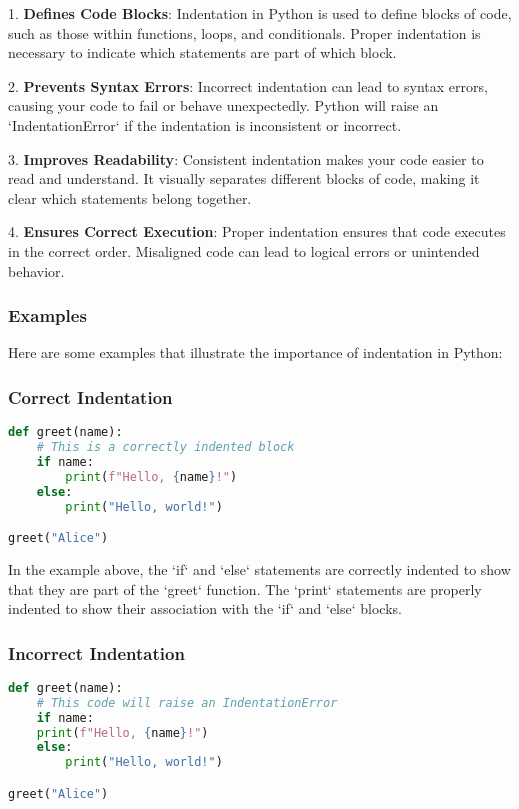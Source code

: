 1. \textbf{Defines Code Blocks}: Indentation in Python is used to define blocks of code, such as those within functions, loops, and conditionals. Proper indentation is necessary to indicate which statements are part of which block.

2. \textbf{Prevents Syntax Errors}: Incorrect indentation can lead to syntax errors, causing your code to fail or behave unexpectedly. Python will raise an `IndentationError` if the indentation is inconsistent or incorrect.

3. \textbf{Improves Readability}: Consistent indentation makes your code easier to read and understand. It visually separates different blocks of code, making it clear which statements belong together.

4. \textbf{Ensures Correct Execution}: Proper indentation ensures that code executes in the correct order. Misaligned code can lead to logical errors or unintended behavior.

\subsubsection{Examples}

Here are some examples that illustrate the importance of indentation in Python:

\subsubsection{Correct Indentation}

\begin{lstlisting}[language=Python, caption=Correct Indentation Example]
def greet(name):
    # This is a correctly indented block
    if name:
        print(f"Hello, {name}!")
    else:
        print("Hello, world!")

greet("Alice")
\end{lstlisting}

In the example above, the `if` and `else` statements are correctly indented to show that they are part of the `greet` function. The `print` statements are properly indented to show their association with the `if` and `else` blocks.

\subsubsection{Incorrect Indentation}

\begin{lstlisting}[language=Python, caption=Incorrect Indentation Example]
def greet(name):
    # This code will raise an IndentationError
    if name:
    print(f"Hello, {name}!")
    else:
        print("Hello, world!")

greet("Alice")
\end{lstlisting}

